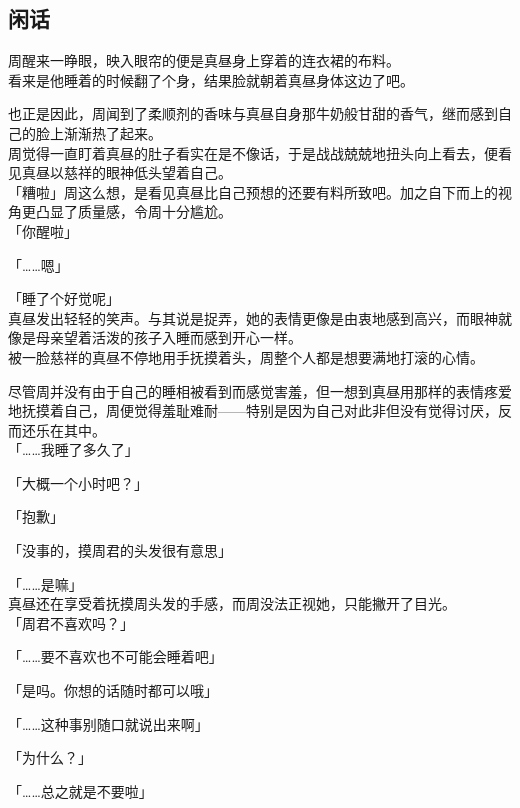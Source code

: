 \subsection{闲话}

周醒来一睁眼，映入眼帘的便是真昼身上穿着的连衣裙的布料。\\

看来是他睡着的时候翻了个身，结果脸就朝着真昼身体这边了吧。

也正是因此，周闻到了柔顺剂的香味与真昼自身那牛奶般甘甜的香气，继而感到自己的脸上渐渐热了起来。\\

周觉得一直盯着真昼的肚子看实在是不像话，于是战战兢兢地扭头向上看去，便看见真昼以慈祥的眼神低头望着自己。\\

「糟啦」周这么想，是看见真昼比自己预想的还要有料所致吧。加之自下而上的视角更凸显了质量感，令周十分尴尬。\\

「你醒啦」

「……嗯」

「睡了个好觉呢」\\

真昼发出轻轻的笑声。与其说是捉弄，她的表情更像是由衷地感到高兴，而眼神就像是母亲望着活泼的孩子入睡而感到开心一样。\\

被一脸慈祥的真昼不停地用手抚摸着头，周整个人都是想要满地打滚的心情。

尽管周并没有由于自己的睡相被看到而感觉害羞，但一想到真昼用那样的表情疼爱地抚摸着自己，周便觉得羞耻难耐——特别是因为自己对此非但没有觉得讨厌，反而还乐在其中。\\

「……我睡了多久了」

「大概一个小时吧？」

「抱歉」

「没事的，摸周君的头发很有意思」

「……是嘛」\\

真昼还在享受着抚摸周头发的手感，而周没法正视她，只能撇开了目光。\\

「周君不喜欢吗？」

「……要不喜欢也不可能会睡着吧」

「是吗。你想的话随时都可以哦」

「……这种事别随口就说出来啊」

「为什么？」

「……总之就是不要啦」\\

